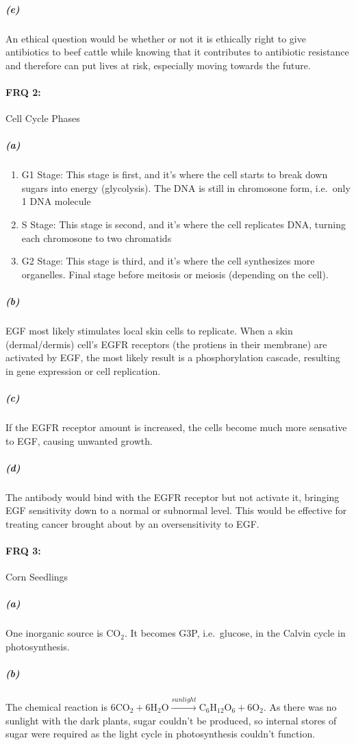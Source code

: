 \documentclass[12pt]{article}
\begin{document}
        \subparagraph*{(e)\\}
            An ethical question would be whether or not it is ethically right to give antibiotics to beef cattle while knowing that it contributes to antibiotic resistance and therefore can put lives at risk, especially moving towards the future.

    \paragraph{FRQ 2:} Cell Cycle Phases
        \subparagraph*{(a)}
            \begin{enumerate}
                \item G1 Stage: This stage is first, and it's where the cell starts to break down sugars into energy (glycolysis). The DNA is still in chromosone form, i.e.\ only 1 DNA molecule
                \item S Stage: This stage is second, and it's where the cell replicates DNA, turning each chromosone to two chromatids
                \item G2 Stage: This stage is third, and it's where the cell synthesizes more organelles. Final stage before meitosis or meiosis (depending on the cell).
            \end{enumerate}
        \subparagraph*{(b)}
         EGF most likely stimulates local skin cells to replicate. When a skin (dermal/dermis) cell's EGFR receptors (the protiens in their membrane) are activated by EGF, the most likely result is a phosphorylation cascade, resulting in gene expression or cell replication.
        \subparagraph*{(c)}
         If the EGFR receptor amount is increased, the cells become much more sensative to EGF, causing unwanted growth.
        \subparagraph*{(d)}
         The antibody would bind with the EGFR receptor but not activate it, bringing EGF sensitivity down to a normal or subnormal level. This would be effective for treating cancer brought about by an oversensitivity to EGF.


    \paragraph{FRQ 3:} Corn Seedlings
        \subparagraph*{(a)} One inorganic source is $\mathrm{CO_{2}}$. It becomes G3P, i.e.\ glucose, in the Calvin cycle in photosynthesis.
        \subparagraph*{(b)} The chemical reaction is $\mathrm{6CO_{2} + 6H_{2}O} \xrightarrow{sunlight} \mathrm{C_{6}H_{12}O_{6} + 6O_{2}}$. As there was no sunlight with the dark plants, sugar couldn't be produced, so internal stores of sugar were required as the light cycle in photosynthesis couldn't function.
\end{document}
